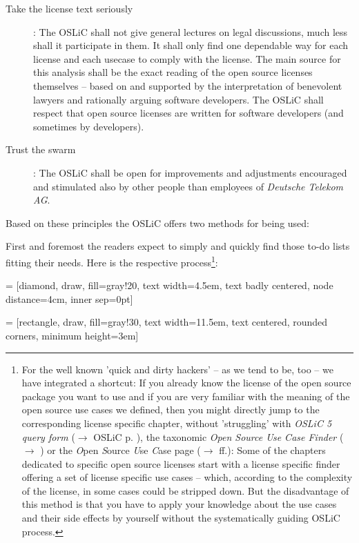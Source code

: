 \begin{description}
  \item[Take the license text seriously]: The OSLiC shall not give general
  lectures on legal discussions, much less shall it participate in them. It
  shall only find one dependable way for each license and each usecase to comply
  with the license. The main source for this analysis shall be the exact reading
  of the open source licenses themselves -- based on and supported by the
  interpretation of benevolent lawyers and rationally arguing software
  developers. The OSLiC shall respect that open source licenses are written for
  software developers (and sometimes by developers).
  
  \item[Trust the swarm]: The OSLiC shall be open for improvements and
  adjustments encouraged and stimulated also by other people than employees of
  \emph{Deutsche Telekom AG}.
\end{description}

Based on these principles the OSLiC offers two methods for being used:

First and foremost the readers expect to simply and quickly find those to-do
lists fitting their needs. Here is the respective process\footnote{For the well
known 'quick and dirty hackers' -- as we tend to be, too -- we have integrated a
shortcut: If you already know the license of the open source package you want to
use and if you are very familiar with the meaning of the open source use cases
we defined, then you might directly jump to the corresponding license specific
chapter, without 'struggling' with \textit{OSLiC 5 query form} ($\rightarrow$
OSLiC p. \pageref{OSLiCStandardFormForGatheringInformation}), the taxonomic
\textit{Open Source Use Case Finder} ($\rightarrow$
\pageref{OSLiCUseCaseFinder}) or the \textit{O}pen \textit{S}ource \textit{U}se
\textit{C}ase page ($\rightarrow$ \pageref{OSUCList}ff.): Some of the chapters
dedicated to specific open source licenses start with a license specific
finder offering a set of license specific use cases -- which, according to the
complexity of the license, in some cases could be stripped down. But the
disadvantage of this method is that you have to apply your knowledge about the
use cases and their side effects by yourself without the systematically guiding
OSLiC process.}:

 = [diamond, draw, fill=gray!20, 
    text width=4.5em, text badly centered, node distance=4cm, inner sep=0pt]

 = [rectangle, draw, fill=gray!30, 
    text width=11.5em, text centered, rounded corners, minimum height=3em]
 
